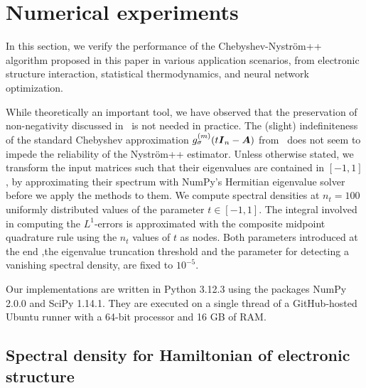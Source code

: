 
\section{Numerical experiments}
\label{sec:results}


In this section, we verify the performance of the Chebyshev-Nyström++ algorithm proposed in this paper in various application scenarios, from electronic structure interaction, statistical thermodynamics, and neural network optimization.

While theoretically an important tool, we have observed that the preservation of non-negativity discussed in~ is not needed in practice. The (slight) indefiniteness of the standard Chebyshev approximation $g_{\sigma}^{(m)}(t \boldsymbol{I}_n - \boldsymbol{A})$ from~ does not seem to impede the reliability of the Nyström++ estimator. Unless otherwise stated, we transform the input matrices such that their eigenvalues are contained in $[-1, 1]$, by approximating their spectrum with NumPy's Hermitian eigenvalue solver before we apply the methods to them. We compute spectral densities at $n_t = 100$ uniformly distributed values of the parameter $t \in [-1, 1]$. The integral involved in computing the $L^1$-errors is approximated with the composite midpoint quadrature rule using the $n_t$ values of $t$ as nodes. Both parameters introduced at the end ,the eigenvalue truncation threshold and the parameter for detecting a vanishing spectral density, are fixed to $10^{-5}$.

Our implementations are written in Python 3.12.3 using the packages NumPy 2.0.0 and SciPy 1.14.1. They are executed on a single thread of a GitHub-hosted Ubuntu runner with a 64-bit processor and 16 GB of RAM. 

\subsection{Spectral density for Hamiltonian of electronic structure}
\label{subsec:hamiltonian}

